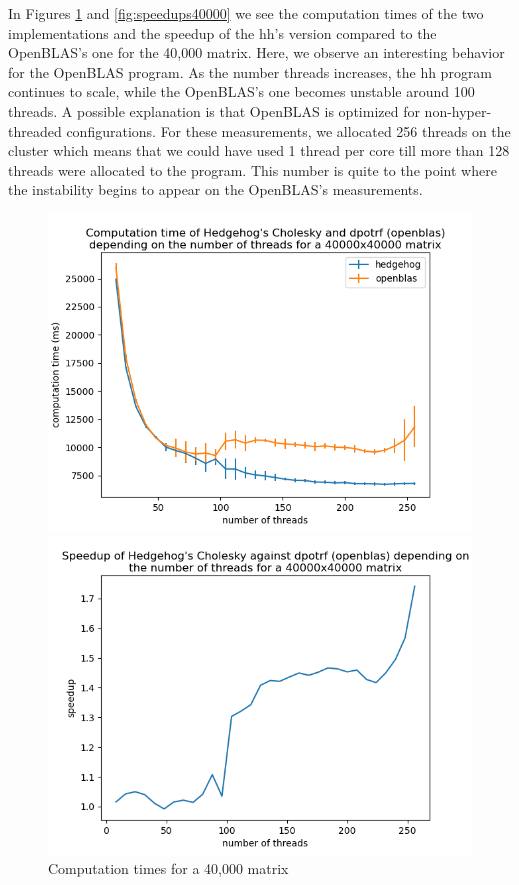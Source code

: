 In Figures \ref{fig:time40000} and \ref{fig:speedups40000} we see the
computation times of the two implementations and the speedup of the \gls{hh}'s
version compared to the OpenBLAS's one for the 40,000 matrix. Here, we observe an
interesting behavior for the OpenBLAS program. As the number threads increases,
the \gls{hh} program continues to scale, while the OpenBLAS's one becomes
unstable around 100 threads. A possible explanation is that OpenBLAS is
optimized for non-hyper-threaded configurations. For these measurements, we
allocated 256 threads on the cluster which means that we could have used 1
thread per core till more than 128 threads were allocated to the program. This
number is quite to the point where the instability begins to appear on the
OpenBLAS's measurements.

\begin{figure}[!htb]
  \begin{minipage}{0.48\linewidth}
    \centering
    \includegraphics[scale=0.5]{img/cho-img/times-40000.png}
    \caption{Computation times for a 40,000 matrix}
    \label{fig:time40000}
  \end{minipage}\hfill
  \begin{minipage}{0.48\linewidth}
    \centering
    \includegraphics[scale=0.5]{img/cho-img/speedup-40000.png}

\end{minipage}
\end{figure}
